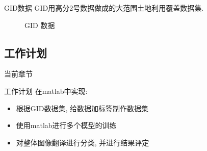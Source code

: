 \begin{frame}{GID数据}
    GID用高分2号数据做成的大范围土地利用覆盖数据集. 
    \begin{figure}[!htbp]
        \centering
        \quad
        \caption{GID 数据}
        \label{fig:0201}
    \end{figure}
\end{frame}

\subsection{工作计划}
\begin{frame}{当前章节}
\end{frame}

\begin{frame}{工作计划}
    在matlab中实现:
    \begin{itemize}
        \item 根据GID数据集, 给数据加标签制作数据集
        \item 使用matlab进行多个模型的训练
        \item 对整体图像翻译进行分类, 并进行结果评定
    \end{itemize}
\end{frame}

